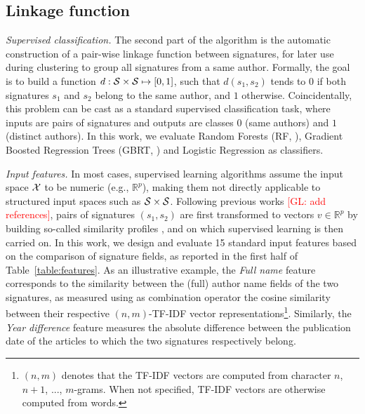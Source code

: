 \documentclass{article}
\newcommand{\glnote}[1]{\textcolor{red}{[GL: #1]}}
\begin{document}

\subsection{Linkage function}
\label{methods:linkage}

\textit{Supervised classification.} The second part of the algorithm is the
automatic construction of a pair-wise linkage function between signatures, for
later use during clustering to group all signatures from a same author.
Formally, the goal is to build a function $d: {\cal S} \times {\cal S} \mapsto
[0, 1]$, such that $d(s_1, s_2)$ tends to $0$ if both signatures $s_1$ and
$s_2$ belong to the same author, and $1$ otherwise. Coincidentally, this
problem can be cast as a standard supervised classification task, where inputs
are pairs of signatures and outputs are classes $0$ (same authors) and $1$
(distinct authors). In this work, we evaluate Random Forests (RF, \cite{breiman2001random}),
Gradient Boosted Regression Trees (GBRT, \cite{friedman2001greedy}) and Logistic Regression \citep{fan2008liblinear} as classifiers.

\textit{Input features.} In most cases, supervised learning algorithms assume
the input space ${\cal X}$ to be numeric (e.g., $\mathbb{R}^p$), making them
not directly applicable to structured input spaces such as ${\cal S} \times
{\cal S}$. Following previous works \glnote{add references}, pairs of
signatures $(s_1, s_2)$ are first transformed to vectors $v \in \mathbb{R}^p$
by building so-called similarity profiles
\citep{treeratpituk2009disambiguating}, and on which supervised learning is
then carried on. In this work, we design and evaluate 15 standard input
features based on the comparison of signature fields, as reported in the first
half of Table~\ref{table:features}. As an illustrative example, the
\textit{Full name} feature corresponds to the similarity between the (full)
author name fields of the two signatures, as measured using as combination
operator the cosine similarity between their respective $(n,m)$-TF-IDF vector
representations\footnote{$(n,m)$ denotes that the TF-IDF vectors are computed
from character $n$, $n+1$, ..., $m$-grams. When not specified, TF-IDF vectors
are otherwise computed from words.}. Similarly, the \textit{Year difference}
feature measures the absolute difference between the publication date of the
articles to which the two signatures respectively belong.
\end{document}
